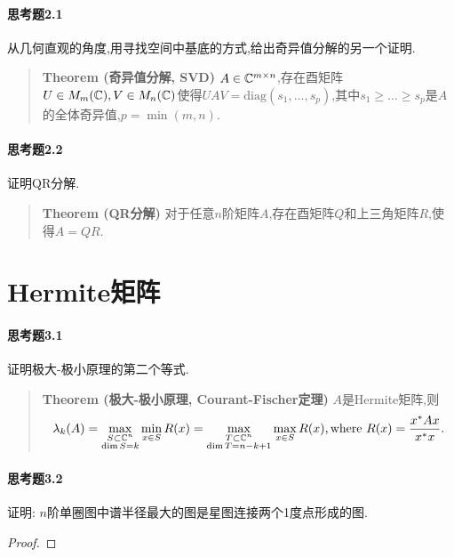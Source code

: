 \documentclass[11pt]{article}
\begin{document}
\paragraph{思考题2.1}从几何直观的角度,用寻找空间中基底的方式,给出奇异值分解的另一个证明.
\begin{quotation}
    \textbf{Theorem (奇异值分解, SVD)} $A\in \mathbb{C}^{m\times n}$,存在酉矩阵$U\in M_m(\mathbb{C}), V\in M_n(\mathbb{C})$使得$UAV=\mathrm{diag}(s_1,\dots,s_p)$,其中$s_1\geq\dots\geq s_p$是$A$的全体奇异值,$p=\min(m,n)$.
\end{quotation}
\paragraph{思考题2.2}证明QR分解.
\begin{quotation}
    \textbf{Theorem (QR分解)} 对于任意$n$阶矩阵$A$,存在酉矩阵$Q$和上三角矩阵$R$,使得$A=QR$.
\end{quotation}

\section{Hermite矩阵}
\paragraph{思考题3.1}证明极大-极小原理的第二个等式.
\begin{quotation}
    \textbf{Theorem (极大-极小原理, Courant-Fischer定理)} $A$是Hermite矩阵,则$$\lambda_k(A)=\max_{\substack{S\subset \mathbb{C}^n\\ \dim S=k}}\min_{x\in S}R(x)=\max_{\substack{T\subset \mathbb{C}^n\\ \dim T=n-k+1}}\max_{x\in S}R(x), \text{where } R(x)=\frac{x^*Ax}{x^*x}.$$
\end{quotation}
\paragraph{思考题3.2}证明: $n$阶单圈图中谱半径最大的图是星图连接两个1度点形成的图.
\begin{proof}
    
\end{proof}
\end{document}
